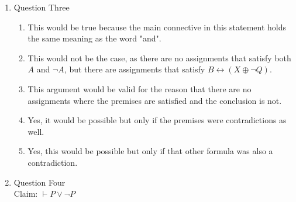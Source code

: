 \documentclass{article}
\begin{document}
\begin{enumerate}
\begin{enumerate}
\begin{proof}[Assume $U \rightarrow V, W \rightarrow V, \neg V$]
\begin{align*}
                &4. \quad \text{Under the assumption of } U \text{ we proved an impossibility of } V \text{ and } \neg V \\
                &\quad \text{ so therefore } \neg U && \text{(Proof By Contradiction)} \\
                &5. \quad Subproof \\
                &6. \quad \hspace{1cm} \text{Suppose } W \text{ towards a contradiction} \\
                &7. \quad \hspace{1cm} \text{From } W, \text{ we can apply } W \rightarrow V \text{ and conclude } V && \text{(Application)} \\
                &8. \quad \text{Under the assumption of } U \text{ we proved an impossibility of } V \text{ and } \neg V \\
                &\quad \text{ so therefore } \neg W && \text{(Proof By Contradiction)} \\
                &9. \quad \text{From } \neg U \text{ and } \neg W, \text{ we can conclude } \neg U \land \neg W && \text{($\land - Introduction$)}
            \end{align*}
        \end{proof}
    \end{enumerate}
    \item Question Three
    \begin{enumerate}
        \item This would be true because the main connective in this statement holds the same meaning as the word "and".
        \item This would not be the case, as there are no assignments that satisfy both $A$ and $\neg A$, but there are assignments that satisfy $B \leftrightarrow (X \oplus \neg Q)$.
        \item This argument would be valid for the reason that there are no assignments where the premises are satisfied and the conclusion is not.
        \item Yes, it would be possible but only if the premises were contradictions as well.
        \item Yes, this would be possible but only if that other formula was also a contradiction.
    \end{enumerate}
    \item Question Four \\
    Claim: $\vdash P \lor \neg P$ \\

\end{enumerate}
\end{document}
